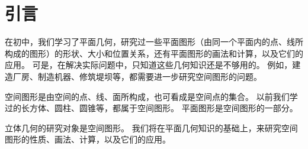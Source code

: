 \chapter{引言}
在初中，我们学习了平面几何，研究过一些平面图形（由同一个平面内的点、线所构成的图形）的形状、大小和位置关系，还有平面图形的画法和计算，以及它们的应用。
可是，在解决实际问题中，只知道这些几何知识还是不够用的。
例如，建造厂房、制造机器、修筑堤坝等，都需要进一步研究空间图形的问题。

空间图形是由空间的点、线、面所构成，也可看成是空间点的集合。
以前我们学过的长方体、圆柱、圆锥等，都属于空间图形。
平面图形是空间图形的一部分。

立体几何的研究对象是空间图形。
我们将在平面几何知识的基础上，来研究空间图形的性质、画法、计算，以及它们的应用。